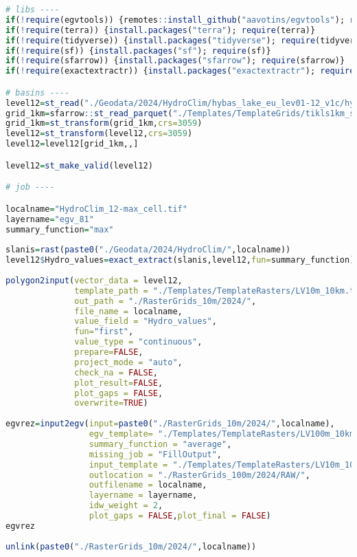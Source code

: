 \documentclass[
]{book}
\begin{document}
\begin{lstlisting}[language=R]
# libs ----
if(!require(egvtools)) {remotes::install_github("aavotins/egvtools"); require(egvtools)}
if(!require(terra)) {install.packages("terra"); require(terra)}
if(!require(tidyverse)) {install.packages("tidyverse"); require(tidyverse)}
if(!require(sf)) {install.packages("sf"); require(sf)}
if(!require(sfarrow)) {install.packages("sfarrow"); require(sfarrow)}
if(!require(exactextractr)) {install.packages("exactextractr"); require(exactextractr)}

# basins ----
level12=st_read("./Geodata/2024/HydroClim/hybas_lake_eu_lev01-12_v1c/hybas_lake_eu_lev12_v1c.shp")
grid_1km=sfarrow::st_read_parquet("./Templates/TemplateGrids/tikls1km_sauzeme.parquet")
grid_1km=st_transform(grid_1km,crs=3059)
level12=st_transform(level12,crs=3059)
level12=level12[grid_1km,,]

level12=st_make_valid(level12)

# job ----

localname="HydroClim_12-max_cell.tif"
layername="egv_81"
summary_function="max"
  
slanis=rast(paste0("./Geodata/2024/HydroClim/",localname))
level12$Hydro_values=exact_extract(slanis,level12,fun=summary_function)
  
polygon2input(vector_data = level12,
              template_path = "./Templates/TemplateRasters/LV10m_10km.tif",
              out_path = "./RasterGrids_10m/2024/",
              file_name = localname,
              value_field = "Hydro_values",
              fun="first",
              value_type = "continuous",
              prepare=FALSE,
              project_mode = "auto",
              check_na = FALSE,
              plot_result=FALSE,
              plot_gaps = FALSE,
              overwrite=TRUE)
  
egvrez=input2egv(input=paste0("./RasterGrids_10m/2024/",localname),
                 egv_template= "./Templates/TemplateRasters/LV100m_10km.tif",
                 summary_function = "average",
                 missing_job = "FillOutput",
                 input_template = "./Templates/TemplateRasters/LV10m_10km.tif",
                 outlocation = "./RasterGrids_100m/2024/RAW/",
                 outfilename = localname,
                 layername = layername,
                 idw_weight = 2,
                 plot_gaps = FALSE,plot_final = FALSE)
egvrez
  
unlink(paste0("./RasterGrids_10m/2024/",localname))
\end{lstlisting}
\end{document}
